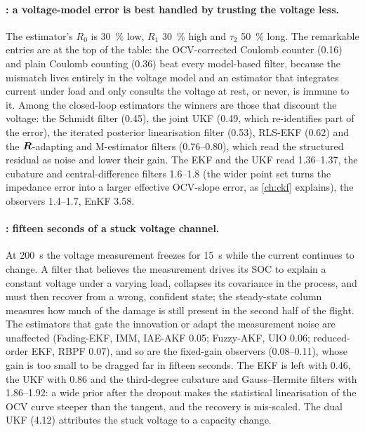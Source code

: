\paragraph{: a voltage-model error is best handled by trusting the voltage less.}
The estimator's $R_0$ is \SI{30}{\percent} low, $R_1$ \SI{30}{\percent} high and $\tau_2$
\SI{50}{\percent} long. The remarkable entries are at the top of the table: the OCV-corrected
Coulomb counter (\num{0.16}) and plain Coulomb counting (\num{0.36}) beat every model-based
filter, because the mismatch lives entirely in the voltage model and an estimator that
integrates current under load and only consults the voltage at rest, or never, is immune to
it. Among the closed-loop estimators the winners are those that discount the voltage: the
Schmidt filter (\num{0.45}), the joint UKF (\num{0.49}, which re-identifies part of the error),
the iterated posterior linearisation filter (\num{0.53}), RLS-EKF (\num{0.62}) and the
$\bm{R}$-adapting and M-estimator filters (\num{0.76}--\num{0.80}), which read the structured residual
as noise and lower their gain. The EKF and the UKF read \num{1.36}--\num{1.37}, the cubature and
central-difference filters \num{1.6}--\num{1.8} (the wider point set turns the impedance error
into a larger effective OCV-slope error, as \cref{ch:ckf} explains), the observers
\num{1.4}--\num{1.7}, EnKF \num{3.58}.

\paragraph{: fifteen seconds of a stuck voltage channel.}
At \SI{200}{\second} the voltage measurement freezes for \SI{15}{\second} while the current
continues to change. A filter that believes the measurement drives its SOC to explain a constant
voltage under a varying load, collapses its covariance in the process, and must then recover
from a wrong, confident state; the steady-state column measures how much of the damage is
still present in the second half of the flight. The estimators that gate the innovation or
adapt the measurement noise are unaffected (Fading-EKF, IMM, IAE-AKF \num{0.05}; Fuzzy-AKF,
UIO \num{0.06}; reduced-order EKF, RBPF \num{0.07}), and so are the fixed-gain observers
(\num{0.08}--\num{0.11}), whose gain is too small to be dragged far in fifteen seconds. The
EKF is left with \num{0.46}, the UKF with \num{0.86} and the third-degree cubature and
Gauss--Hermite filters with \num{1.86}--\num{1.92}: a wide prior after the dropout makes the
statistical linearisation of the OCV curve steeper than the tangent, and the recovery is
mis-scaled. The dual UKF (\num{4.12}) attributes the stuck voltage to a capacity change.

